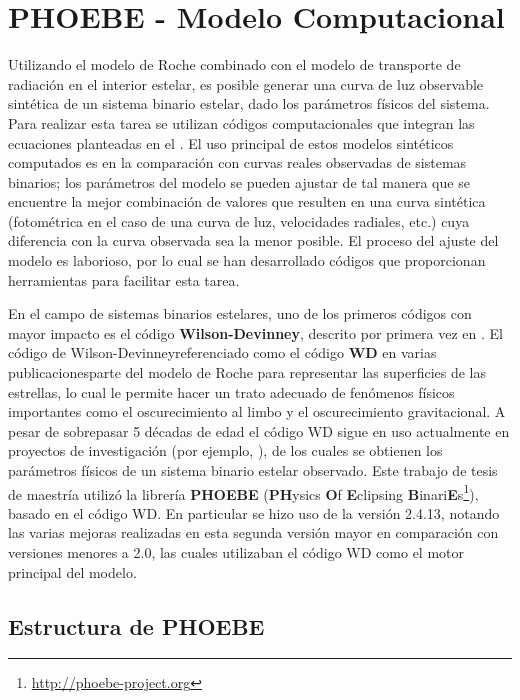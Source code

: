 \chapter{PHOEBE - Modelo Computacional}

Utilizando el modelo de Roche combinado con el modelo de transporte de radiación
en el interior estelar, es posible generar una curva de luz observable sintética
de un sistema binario estelar, dado los parámetros físicos del sistema. Para
realizar esta tarea se utilizan códigos computacionales que integran las
ecuaciones planteadas en el . El uso
principal de estos modelos sintéticos computados es en la comparación con curvas
reales observadas de sistemas binarios; los parámetros del modelo se pueden
ajustar de tal manera que se encuentre la mejor combinación de valores que
resulten en una curva sintética (fotométrica en el caso de una curva de luz,
velocidades radiales, etc.) cuya diferencia con la curva observada sea la menor
posible. El proceso del ajuste del modelo es laborioso, por lo cual se han
desarrollado códigos que proporcionan herramientas para facilitar esta tarea.

En el campo de sistemas binarios estelares, uno de los primeros códigos con
mayor impacto es el código \textbf{Wilson-Devinney}, descrito por primera vez en
. El
código de Wilson-Devinney\textemdash referenciado como el código \textbf{WD} en
varias publicaciones\textemdash parte del modelo de Roche para representar las
superficies de las estrellas, lo cual le permite hacer un trato adecuado de
fenómenos físicos importantes como el oscurecimiento al limbo y el
oscurecimiento gravitacional. A pesar de sobrepasar 5 décadas de edad el código
WD sigue en uso actualmente en proyectos de investigación (por ejemplo,
), de los cuales se
obtienen los parámetros físicos de un sistema binario estelar observado. Este
trabajo de tesis de maestría utilizó la librería \textbf{PHOEBE}
(\textbf{PH}ysics \textbf{O}f \textbf{E}clipsing
\textbf{B}inari\textbf{E}s\footnote{\url{http://phoebe-project.org}}), basado en
el código WD. En particular se hizo uso de la versión 2.4.13, notando las varias
mejoras realizadas en esta segunda versión mayor en comparación con versiones
menores a 2.0, las cuales utilizaban el código WD como el motor principal del
modelo.

\section{Estructura de PHOEBE} \label{intro:phoebe:estructura_phoebe}

